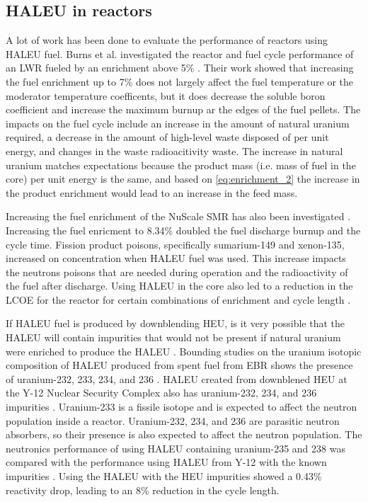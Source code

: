 \subsection{HALEU in reactors}
A lot of work has been done to evaluate the performance of reactors 
using \gls{HALEU} fuel. Burns et al. investigated the reactor and fuel cycle 
performance of an \gls{LWR} fueled by an enrichment above 5\% \cite{burns_reactor_2020}.
Their work showed that increasing the fuel enrichment up to 7\% does not 
largely affect the fuel temperature or the moderator temperature coefficents,
but it does decrease the soluble boron coefficient and increase the maximum 
burnup ar the edges of the fuel pellets. The impacts on the fuel cycle include 
an increase in the amount of natural uranium required, a decrease in the 
amount of high-level waste disposed of per unit energy, and changes in the 
waste radioacitivity waste. The increase in natural uranium matches 
expectations
because the product mass (i.e. mass of fuel in the core) per unit 
energy is the same, and 
based on \ref{eq:enrichment_2} the increase in the product enrichment would 
lead to an increase in the feed mass. 

Increasing the fuel enrichment of the NuScale \gls{SMR} has also been investigated 
\cite{carlson_implications_2022}. Increasing the fuel enricment to 8.34\% doubled the 
fuel discharge burnup and the cycle time. Fission product poisons, specifically 
sumarium-149 and xenon-135, increased on concentration when \gls{HALEU} fuel was used. 
This increase impacts the neutrons poisons that are needed during operation and the 
radioactivity of the fuel after discharge. Using \gls{HALEU} in the core also led 
to a reduction in the \gls{LCOE} for the reactor for certain combinations of 
enrichment and cycle length \cite{carlson_economic_2020,carlson_implications_2022}.

If \gls{HALEU} fuel is produced by downblending \gls{HEU}, is it very possible that 
the \gls{HALEU} will contain impurities that would not be present if natural uranium 
were enriched to produce the \gls{HALEU} \cite{noauthor_establishing_2022}. Bounding 
studies on the uranium isotopic 
composition of \gls{HALEU} produced from spent fuel from \gls{EBR} shows the presence 
of uranium-232, 233, 234, and 236 \cite{vaden_isotopic_2018}. \gls{HALEU} created from 
downblened \gls{HEU} at the Y-12 Nuclear Security Complex also has uranium-232, 234, and 
236 impurities \cite{nelson_foreign_2010}. Uranium-233 is a fissile 
isotope and is expected to affect the neutron population inside a reactor. Uranium-232, 
234, and 236 are parasitic neutron absorbers, so their presence is also expected to affect 
the neutron population. The neutronics performance of using \gls{HALEU} containing
uranium-235 and 238 was compared with the performance using \gls{HALEU} from Y-12 with the 
known impurities \cite{celikten_effects_2021}. Using 
the \gls{HALEU} with the \gls{HEU} impurities showed a 0.43\% reactivity drop, leading to 
an 8\% reduction in the cycle length. 
